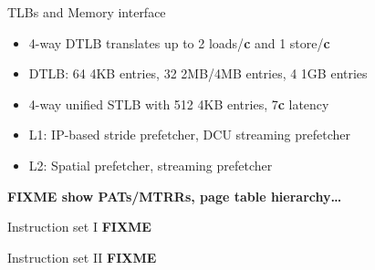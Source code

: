 \documentclass[mathserif,xcolor={dvipsnames,table}]{beamer}
\begin{document}
\begin{frame}{TLBs and Memory interface}
\begin{itemize}
\item 4-way DTLB translates up to 2 loads/\textbf{c} and 1 store/\textbf{c}
\item DTLB: 64 4KB entries, 32 2MB/4MB entries, 4 1GB entries
\item 4-way unified STLB with 512 4KB entries, 7\textbf{c} latency
\item L1: IP-based stride prefetcher, DCU streaming prefetcher
\item L2: Spatial prefetcher, streaming prefetcher
\end{itemize}
\textbf{FIXME show PATs/MTRRs, page table hierarchy\ldots}
\end{frame}

\begin{frame}{Instruction set I}
\huge\textbf{FIXME}
\end{frame}

\begin{frame}{Instruction set II}
\huge\textbf{FIXME}
\end{frame}
\end{document}

